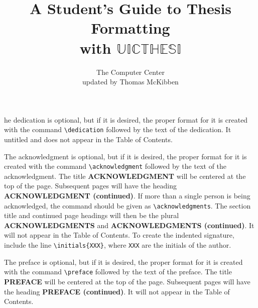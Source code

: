 \documentclass{uicthesi}
\newcommand{\uicthesi}{{$\mathbb{UICTHESI}$}}
\begin{document}
\title{A Student's Guide to Thesis Formatting \\with \uicthesi{}}
\author{The Computer Center\\updated by Thomas McKibben}

 
\maketitle
\copyrightpage
\dedication
The dedication is optional, but if it is desired, the proper format for
it is created with the command \verb+\dedication+ followed by the
text of the dedication.
It untitled and does not appear in the Table of Contents.
 
\acknowledgment
The acknowledgment is optional, but if it is desired, the
proper format for it is created with the command \verb+\acknowledgment+
followed by the text of the acknowledgment.
The title {\bf ACKNOWLEDGMENT} will be centered at the top of the page.
Subsequent pages will have the heading {\bf ACKNOWLEDGMENT (continued)}.
If more than a single person is being acknowledged, the command should
be given as \verb+\acknowledgments+.  The section title and continued
page headings will then be the plural {\bf ACKNOWLEDGMENTS} and
{\bf ACKNOWLEDGMENTS (continued)}.
It will not appear in the Table of Contents.
To create the indented signature, include the line
\verb+\initials{XXX}+, where \verb+XXX+ are the initials of the author.
 
\preface
The preface is optional, but if it is desired, the
proper format for it is created with the command \verb+\preface+
followed by the text of the preface.
The title {\bf PREFACE} will be centered at the top of the page.
Subsequent pages will have the heading {\bf PREFACE (continued)}.
It will not appear in the Table of Contents.
 
\end{document}
